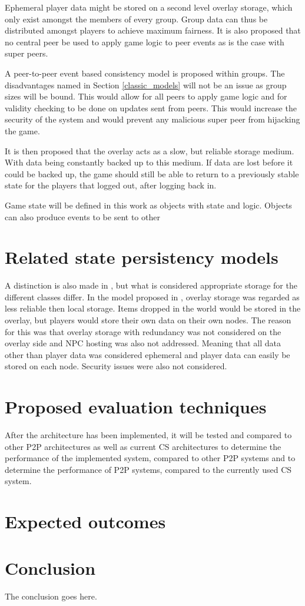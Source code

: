 \documentclass[journal,oneside,a4paper,onecolumn]{IEEEtran}
\begin{document}
Ephemeral player data might be stored on a second level overlay storage, which only exist amongst the members of every group. Group data can thus be distributed amongst players to achieve maximum fairness. It is also proposed that no central peer be used to apply game logic to peer events as is the case with super peers.

A peer-to-peer event based consistency model is proposed within groups. The disadvantages named in Section \ref{classic_models} will not be an issue as group sizes will be bound. This would allow for all peers to apply game logic and for validity checking to be done on updates sent from peers. This would increase the security of the system and would prevent any malicious super peer from hijacking the game.

It is then proposed that the overlay acts as a slow, but reliable storage medium. With data being constantly backed up to this medium. If data are lost before it could be backed up, the game should still be able to return to a previously stable state for the players that logged out, after logging back in.


Game state will be defined in this work as objects with state and logic. Objects can also produce events to be sent to other

\section{Related state persistency models}

A distinction is also made in \cite{}, but what is considered appropriate storage for the different classes differ. In the model proposed in \cite{}, overlay storage was regarded as less reliable then local storage. Items dropped in the world would be stored in the overlay, but players would store their own data on their own nodes. The reason for this was that overlay storage with redundancy was not considered on the overlay side and NPC hosting was also not addressed. Meaning that all data other than player data was considered ephemeral and player data can easily be stored on each node. Security issues were also not considered.

\section{Proposed evaluation techniques}

After the architecture has been implemented, it will be tested and compared to other P2P architectures as well as current \ac{CS} architectures to determine the performance of the implemented system, compared to other P2P systems and to determine the performance of P2P systems, compared to the currently used \ac{CS} system.

\section{Expected outcomes}

\section{Conclusion}
The conclusion goes here.

\newpage



\end{document}
